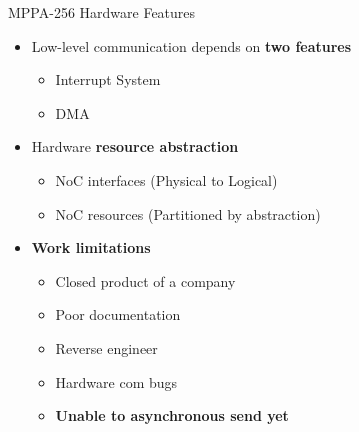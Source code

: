 		\begin{frame}[fragile]{MPPA-256 Hardware Features}
			\begin{itemize}
				\item Low-level communication depends on \textbf{two features}
				\begin{itemize}
					\item Interrupt System
					\item DMA
				\end{itemize}
			\end{itemize}

			\begin{itemize}
				\item Hardware \textbf{resource abstraction}
				\begin{itemize}
					\item NoC interfaces (Physical to Logical)
					\item NoC resources (Partitioned by abstraction)
				\end{itemize}
			\end{itemize}

			\begin{itemize}
				\item \textbf{Work limitations}
				\begin{itemize}
					\item Closed product of a company
					\item Poor documentation
					\item Reverse engineer
					\item Hardware com bugs
					\item \textbf{Unable to asynchronous send yet}
				\end{itemize}
			\end{itemize}

		\end{frame}


